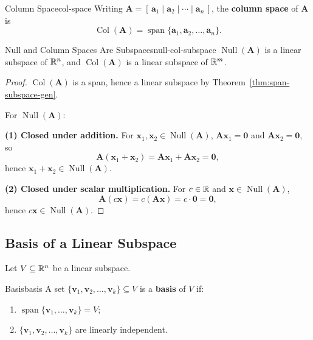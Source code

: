 \begin{definition}{Column Space}{col-space}
  Writing $\mathbf{A} = [\,\mathbf{a}_1 \mid \mathbf{a}_2 \mid \cdots \mid \mathbf{a}_n\,]$, the \textbf{column space} of $\mathbf{A}$ is
  \[
    \operatorname{Col}(\mathbf{A}) = \operatorname{span}\{\mathbf{a}_1, \mathbf{a}_2, \ldots, \mathbf{a}_n\}.
  \]
\end{definition}

\begin{theorem}{Null and Column Spaces Are Subspaces}{null-col-subspace}
  $\operatorname{Null}(\mathbf{A})$ is a linear subspace of $\mathbb{R}^n$, and $\operatorname{Col}(\mathbf{A})$ is a linear subspace of $\mathbb{R}^m$.
\end{theorem}

\begin{proof}
  $\operatorname{Col}(\mathbf{A})$ is a span, hence a linear subspace by Theorem~\ref{thm:span-subspace-gen}.

  For $\operatorname{Null}(\mathbf{A})$:

  \textbf{(1) Closed under addition.} For $\mathbf{x}_1, \mathbf{x}_2 \in \operatorname{Null}(\mathbf{A})$, $\mathbf{A}\mathbf{x}_1 = \mathbf{0}$ and $\mathbf{A}\mathbf{x}_2 = \mathbf{0}$, so
  \[
    \mathbf{A}(\mathbf{x}_1 + \mathbf{x}_2) = \mathbf{A}\mathbf{x}_1 + \mathbf{A}\mathbf{x}_2 = \mathbf{0},
  \]
  hence $\mathbf{x}_1 + \mathbf{x}_2 \in \operatorname{Null}(\mathbf{A})$.

  \textbf{(2) Closed under scalar multiplication.} For $c \in \mathbb{R}$ and $\mathbf{x} \in \operatorname{Null}(\mathbf{A})$,
  \[
    \mathbf{A}(c\mathbf{x}) = c(\mathbf{A}\mathbf{x}) = c \cdot \mathbf{0} = \mathbf{0},
  \]
  hence $c\mathbf{x} \in \operatorname{Null}(\mathbf{A})$.
\end{proof}

\subsection{Basis of a Linear Subspace}

Let $V \subseteq \mathbb{R}^n$ be a linear subspace.

\begin{definition}{Basis}{basis}
  A set $\{\mathbf{v}_1, \mathbf{v}_2, \ldots, \mathbf{v}_k\} \subseteq V$ is a \textbf{basis} of $V$ if:
  \begin{enumerate}
    \item $\operatorname{span}\{\mathbf{v}_1, \ldots, \mathbf{v}_k\} = V$;
    \item $\{\mathbf{v}_1, \mathbf{v}_2, \ldots, \mathbf{v}_k\}$ are linearly independent.
  \end{enumerate}
\end{definition}

